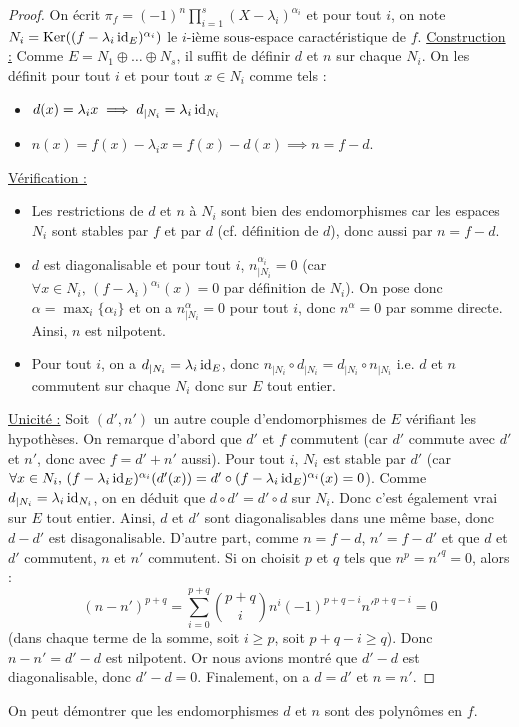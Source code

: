   \begin{proof}
    On écrit $\pi_f = (-1)^n \prod_{i=1}^s (X - \lambda_i)^{\alpha_i}$ et pour tout $i$, on note $N_i = \mathrm{Ker}((f-\lambda_i \operatorname{id}_E)^{\alpha_i})$ le $i$-ième sous-espace caractéristique de $f$.
    \newpar
    \uline{Construction :} Comme $E = N_1 \oplus \dots \oplus N_s$, il suffit de définir $d$ et $n$ sur chaque $N_i$. On les définit pour tout $i$ et pour tout $x \in N_i$ comme tels :
    \begin{itemize}
      \item $d(x) = \lambda_i x \implies d_{|N_i} = \lambda_i \operatorname{id}_{N_i}$
      \item $n(x) = f(x) - \lambda_i x = f(x) - d(x) \implies n = f - d$.
    \end{itemize}
    \medskip
    \uline{Vérification :}
    \begin{itemize}
      \item Les restrictions de $d$ et $n$ à $N_i$ sont bien des endomorphismes car les espaces $N_i$ sont stables par $f$ et par $d$ (cf. définition de $d$), donc aussi par $n = f - d$.
      \item $d$ est diagonalisable et pour tout $i$, $n_{|N_i}^{\alpha_i} = 0$ (car $\forall x \in N_i, \, (f-\lambda_i)^{\alpha_i}(x) = 0$ par définition de $N_i$). On pose donc $\alpha = \max_{i} \{ \alpha_i \}$ et on a $n_{|N_i}^\alpha = 0$ pour tout $i$, donc $n^\alpha = 0$ par somme directe. Ainsi, $n$ est nilpotent.
      \item Pour tout $i$, on a $d_{|N_i} = \lambda_i \operatorname{id}_E$, donc $n_{|N_i} \circ d_{|N_i} = d_{|N_i} \circ n_{|N_i}$ i.e. $d$ et $n$ commutent sur chaque $N_i$ donc sur $E$ tout entier.
    \end{itemize}
    \medskip
    \uline{Unicité :} Soit $(d', n')$ un autre couple d'endomorphismes de $E$ vérifiant les hypothèses. On remarque d'abord que $d'$ et $f$ commutent (car $d'$ commute avec $d'$ et $n'$, donc avec $f = d' + n'$ aussi). Pour tout $i$, $N_i$ est stable par $d'$ (car $\forall x \in N_i, \, (f-\lambda_i \operatorname{id}_E)^{\alpha_i}(d'(x)) = d' \circ (f-\lambda_i \operatorname{id}_E)^{\alpha_i}(x) = 0$). Comme $d_{|N_i} = \lambda_i \operatorname{id}_{N_i}$, on en déduit que $d \circ d' = d' \circ d$ sur $N_i$. Donc c'est également vrai sur $E$ tout entier. Ainsi, $d$ et $d'$ sont diagonalisables dans une même base, donc $d - d'$ est disagonalisable.
    \newpar
    D'autre part, comme $n = f-d$, $n' = f-d'$ et que $d$ et $d'$ commutent, $n$ et $n'$ commutent. Si on choisit $p$ et $q$ tels que $n^p = n'^q = 0$, alors :
    \[ (n-n')^{p+q} = \sum_{i=0}^{p+q} \binom{p+q}{i} n^{i} (-1)^{p+q-i} n'^{p+q-i} = 0 \]
    (dans chaque terme de la somme, soit $i \geq p$, soit $p+q-i \geq q$). Donc $n - n' = d' - d$ est nilpotent. Or nous avions montré que $d' - d$ est diagonalisable, donc $d'-d = 0$. Finalement, on a $d = d'$ et $n = n'$.
  \end{proof}

  \begin{remark}
    On peut démontrer que les endomorphismes $d$ et $n$ sont des polynômes en $f$.
  \end{remark}

